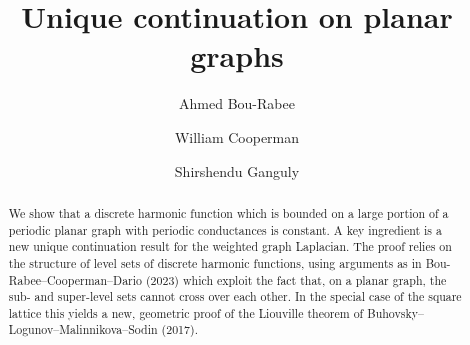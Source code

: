 \documentclass{daj}
\begin{document}
\begin{frontmatter}[classification=text]

\title{Unique continuation on planar graphs} %

\author[abou]{Ahmed Bou-Rabee}
\author[wcoop]{William Cooperman}
\author[sgang]{Shirshendu Ganguly}



\begin{abstract}
  We show that a discrete harmonic function which is bounded on a large portion of a periodic planar graph with periodic conductances is constant. A key ingredient is a new unique continuation result for the weighted graph Laplacian. The proof relies on the structure of level sets of discrete harmonic functions, using arguments as in Bou-Rabee--Cooperman--Dario (2023) which exploit the fact that, on a planar graph, the sub- and super-level sets cannot cross over each other. In the special case of the square lattice this yields a new, geometric proof of the Liouville theorem of Buhovsky–Logunov–Malinnikova–Sodin (2017).
\end{abstract}
\end{frontmatter}

\end{document}
